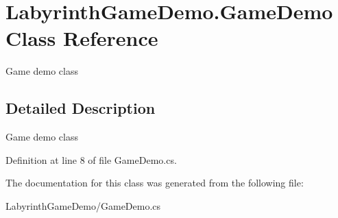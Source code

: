 \hypertarget{class_labyrinth_game_demo_1_1_game_demo}{\section{Labyrinth\+Game\+Demo.\+Game\+Demo Class Reference}
\label{class_labyrinth_game_demo_1_1_game_demo}
}


Game demo class  




\subsection{Detailed Description}
Game demo class 



Definition at line 8 of file Game\+Demo.\+cs.



The documentation for this class was generated from the following file\+:\begin{DoxyCompactItemize}
\item 
Labyrinth\+Game\+Demo/Game\+Demo.\+cs\end{DoxyCompactItemize}

